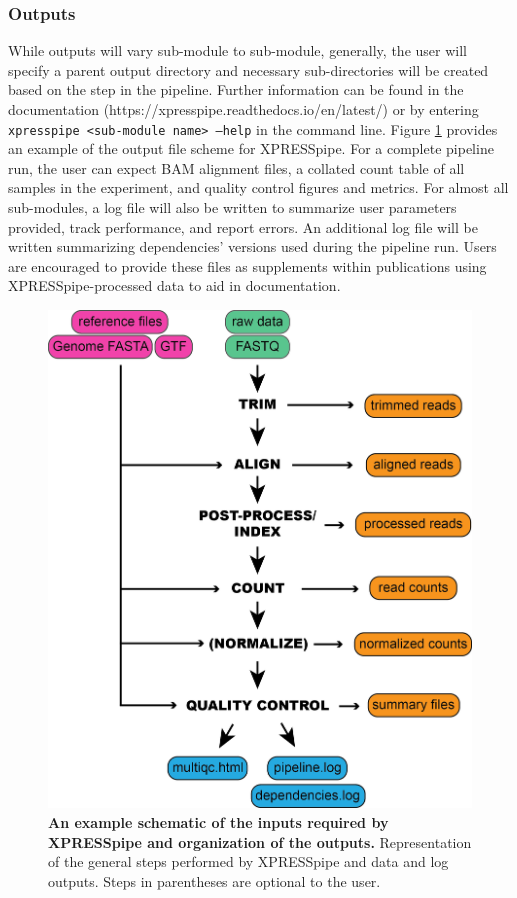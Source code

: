 \documentclass[10pt, oneside]{article}
\begin{document}
\subsubsection{Outputs}
While outputs will vary sub-module to sub-module, generally, the user will specify a parent output directory and necessary sub-directories will be created based on the step in the pipeline. Further information can be found in the documentation (https://xpresspipe.readthedocs.io/en/latest/) or by entering \texttt{xpresspipe \textless sub-module name\textgreater \ --help} in the command line. Figure \ref{fig:outputs} provides an example of the output file scheme for XPRESSpipe. For a complete pipeline run, the user can expect BAM alignment files, a collated count table of all samples in the experiment, and quality control figures and metrics. For almost all sub-modules, a log file will also be written to summarize user parameters provided, track performance, and report errors. An additional log file will be written summarizing dependencies' versions used during the pipeline run. Users are encouraged to provide these files as supplements within publications using XPRESSpipe-processed data to aid in documentation.

\begin{figure}
\centering
  \includegraphics[width=120mm]{figures/xpresspipe_figure1.png}
  \caption{\textbf{An example schematic of the inputs required by XPRESSpipe and organization of the outputs.} Representation of the general steps performed by XPRESSpipe and data and log outputs. Steps in parentheses are optional to the user.}
  \label{fig:outputs}
\end{figure}
\end{document}
